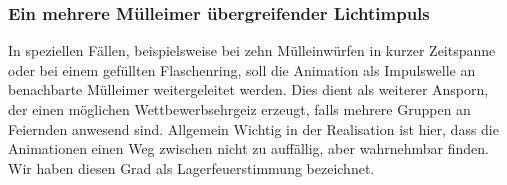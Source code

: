    \subsubsection{Ein mehrere Mülleimer übergreifender Lichtimpuls}

        In speziellen Fällen, beispielsweise bei zehn Mülleinwürfen in kurzer Zeitspanne oder bei einem gefüllten Flaschenring, soll die Animation als Impulswelle an benachbarte Mülleimer weitergeleitet werden.
        Dies dient als weiterer Ansporn, der einen möglichen Wettbewerbsehrgeiz erzeugt, falls mehrere Gruppen an Feiernden anwesend sind.
        Allgemein Wichtig in der Realisation ist hier, dass die Animationen einen Weg zwischen nicht zu auffällig, aber wahrnehmbar finden.
        Wir haben diesen Grad als Lagerfeuerstimmung bezeichnet.
